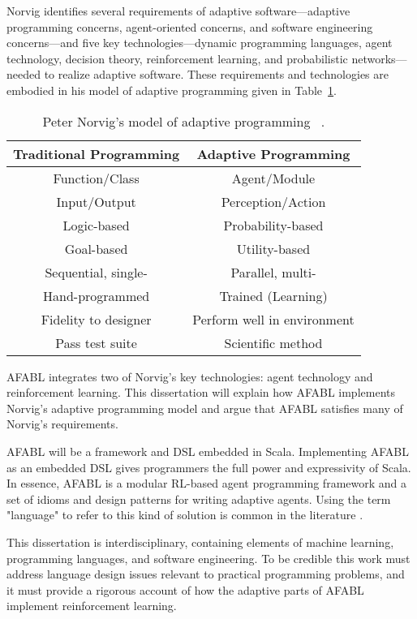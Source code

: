Norvig identifies several requirements of adaptive
soft\-ware---adaptive programming concerns, agent-oriented concerns,
and software engineering concerns---and five key
technologies---dynamic programming languages, agent technology,
decision theory, reinforcement learning, and probabilistic
networks---needed to realize adaptive software.  These requirements
and technologies are embodied in his model of adaptive programming
given in Table~\ref{tab:adaptive-model}.

\begin{table}[h]
\begin{tabular}{|c|c|}\hline
Traditional Programming & Adaptive Programming \\ \hline
Function/Class & Agent/Module \\
Input/Output & Perception/Action \\
Logic-based & Probability-based \\
Goal-based & Utility-based \\
Sequential, single- & Parallel, multi- \\
Hand-programmed & Trained (Learning) \\
Fidelity to designer & Perform well in environment \\
Pass test suite & Scientific method\\ \hline
\end{tabular}
\caption{Peter Norvig's model of adaptive programming
  ~\cite{norvig1998decision}.}
\label{tab:adaptive-model}
\end{table}

AFABL integrates two of Norvig's key technologies: agent technology and reinforcement learning.  This dissertation will explain how AFABL implements Norvig's adaptive programming model and argue that AFABL satisfies many of Norvig's requirements.

AFABL will be a framework and DSL embedded in Scala.  Implementing AFABL as an embedded DSL gives programmers the full power and expressivity of Scala.  In essence, AFABL is a modular RL-based agent programming framework and a set of idioms and design patterns for writing adaptive agents.  Using the term "language" to refer to this kind of solution is common in the literature \cite{andre2002state}.

This dissertation is interdisciplinary, containing elements of machine learning, programming languages, and software engineering.  To be credible this work must address language design issues relevant to practical programming problems, and it must provide a rigorous account of how the adaptive parts of AFABL implement reinforcement learning.

